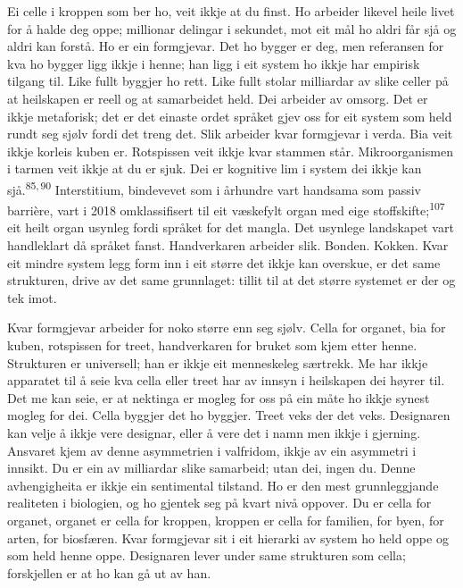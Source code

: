 \begin{widebody}
{Ei celle i kroppen som ber ho, veit ikkje at du finst. Ho arbeider likevel heile livet for å halde deg oppe; millionar delingar i sekundet, mot eit mål ho aldri får sjå og aldri kan forstå. Ho er ein formgjevar. Det ho bygger er deg, men referansen for kva ho bygger ligg ikkje i henne; han ligg i eit system ho ikkje har empirisk tilgang til. Like fullt byggjer ho rett. Like fullt stolar milliardar av slike celler på at heilskapen er reell og at samarbeidet held. Dei arbeider av omsorg. Det er ikkje metaforisk; det er det einaste ordet språket gjev oss for eit system som held rundt seg sjølv fordi det treng det. Slik arbeider kvar formgjevar i verda. Bia veit ikkje korleis kuben er. Rotspissen veit ikkje kvar stammen står. Mikroorganismen i tarmen veit ikkje at du er sjuk. Dei er kognitive lim i system dei ikkje kan sjå.\textsuperscript{85,\,90} Interstitium, bindevevet som i århundre vart handsama som passiv barrière, vart i 2018 omklassifisert til eit væskefylt organ med eige stoffskifte;\textsuperscript{107} eit heilt organ usynleg fordi språket for det mangla. Det usynlege landskapet vart handleklart då språket fanst. Handverkaren arbeider slik. Bonden. Kokken. Kvar eit mindre system legg form inn i eit større det ikkje kan overskue, er det same strukturen, drive av det same grunnlaget: tillit til at det større systemet er der og tek imot.

Kvar formgjevar arbeider for noko større enn seg sjølv. Cella for organet, bia for kuben, rotspissen for treet, handverkaren for bruket som kjem etter henne. Strukturen er universell; han er ikkje eit menneskeleg særtrekk. Me har ikkje apparatet til å seie kva cella eller treet har av innsyn i heilskapen dei høyrer til. Det me kan seie, er at nektinga er mogleg for oss på ein måte ho ikkje synest mogleg for dei. Cella byggjer det ho byggjer. Treet veks der det veks. Designaren kan velje å ikkje vere designar, eller å vere det i namn men ikkje i gjerning. Ansvaret kjem av denne asymmetrien i valfridom, ikkje av ein asymmetri i innsikt. Du er ein av milliardar slike samarbeid; utan dei, ingen du. Denne avhengigheita er ikkje ein sentimental tilstand. Ho er den mest grunnleggjande realiteten i biologien, og ho gjentek seg på kvart nivå oppover. Du er cella for organet, organet er cella for kroppen, kroppen er cella for familien, for byen, for arten, for biosfæren. Kvar formgjevar sit i eit hierarki av system ho held oppe og som held henne oppe. Designaren lever under same strukturen som cella; forskjellen er at ho kan gå ut av han.

}
\end{widebody}
